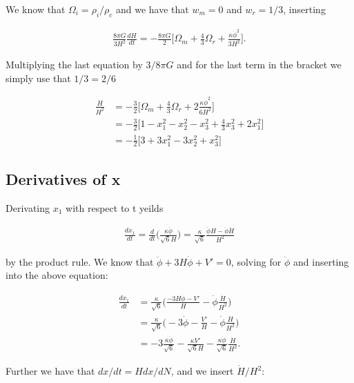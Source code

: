 \documentclass[a4paper,10pt]{article}
\begin{document}
We know that $\Omega_i = \rho_i/\rho_c$ and we have that $w_m = 0$ and $w_r = 1/3$, inserting

\begin{align}
\frac{8\pi G}{3H^2}\frac{dH}{dt} = -\frac{8\pi G}{2}\bigg[\Omega_m + \frac{4}{3}\Omega_r + \frac{\kappa \dot{\phi}^2}{3H^2}\bigg].
\end{align}

Multiplying the last equation by $3/8\pi G$ and for the last term in the bracket we simply use that $1/3 = 2/6$

\begin{equation*}
\begin{split}
\frac{\dot{H}}{H^2} &= -\frac{3}{2}\bigg[\Omega_m + \frac{4}{3}\Omega_r + 2\frac{\kappa \dot{\phi}^2}{6H^2}\bigg] \\
&= -\frac{3}{2}\bigg[1 - x_1^2 - x_2^2 - x_3^2 + \frac{4}{3}x_3^2 + 2x_1^2\bigg] \\
&= -\frac{1}{2}\bigg[3 + 3x_1^2 - 3x_2^2 + x_3^2\bigg]
\end{split}
\end{equation*}


\subsection{Derivatives of x}
Derivating $x_1$ with respect to t yeilds

\begin{align*}
\frac{dx_1}{dt} = \frac{d}{dt}\bigg(\frac{\kappa \dot{\phi}}{\sqrt{6}H}\bigg) = \frac{\kappa}{\sqrt{6}}\frac{\ddot{\phi}H - \dot{\phi}\dot{H}}{H^2}
\end{align*}

by the product rule. We know that $\ddot{\phi} + 3H\dot{\phi} + V' = 0$, solving for $\ddot{\phi}$ and inserting into the above equation:

\begin{align*}
\frac{dx_1}{dt} &= \frac{\kappa}{\sqrt{6}}\bigg(\frac{-3H\dot{\phi}-V'}{H} - \dot{\phi}\frac{\dot{H}}{H^2}\bigg)\\
&= \frac{\kappa}{\sqrt{6}}\bigg(-3\dot{\phi} - \frac{V'}{H} - \dot{\phi}\frac{\dot{H}}{H^2}\bigg) \\
&= -3\frac{\kappa \dot{\phi}}{\sqrt{6}} - \frac{\kappa V'}{\sqrt{6}H} - \frac{\kappa \dot{\phi}}{\sqrt{6}}\frac{\dot{H}}{H^2}.
\end{align*}

Further we have that $dx/dt = Hdx/dN$, and we insert $\dot{H}/H^2$:
\end{document}
